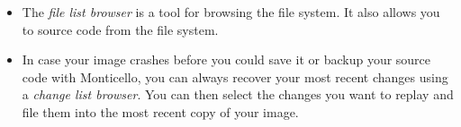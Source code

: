 \documentclass[a4paper,10pt,twoside]{book}
\begin{document}
\begin{itemize}
  \item The \emph{file list browser} is a tool for browsing the file system. It also allows you to  source code from the file system.
  \item In case your image crashes before you could save it or backup your source code with Monticello, you can always recover your most recent changes using a \emph{change list browser}. You can then select the changes you want to replay and file them into the most recent copy of your image.
\end{itemize}

\ifx\wholebook\relax\else
\end{document}
